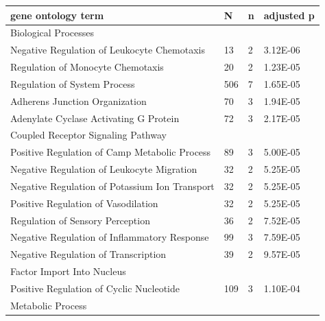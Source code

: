 \begin{refsection}
\begin{table}[H]
\small
{}\selectfont
{} \label{table3S12}
\centering
\begin{tabular}{@{}llll@{}}
\hline
gene ontology term                                  & N   & n & adjusted p \\ \hline
Biological Processes                                &     &   &                  \\
Negative Regulation of Leukocyte Chemotaxis         & 13  & 2 & 3.12E-06         \\
Regulation of Monocyte Chemotaxis                   & 20  & 2 & 1.23E-05         \\
Regulation of System Process                        & 506 & 7 & 1.65E-05         \\
Adherens Junction Organization                      & 70  & 3 & 1.94E-05         \\
Adenylate Cyclase Activating G Protein              & 72  & 3 & 2.17E-05         \\
Coupled Receptor Signaling Pathway                  &     &   &                  \\
Positive Regulation of Camp Metabolic Process       & 89  & 3 & 5.00E-05         \\
Negative Regulation of Leukocyte Migration          & 32  & 2 & 5.25E-05         \\
Negative Regulation of Potassium Ion Transport      & 32  & 2 & 5.25E-05         \\
Positive Regulation of Vasodilation                 & 32  & 2 & 5.25E-05         \\
Regulation of Sensory Perception                    & 36  & 2 & 7.52E-05         \\
Negative Regulation of Inflammatory Response        & 99  & 3 & 7.59E-05         \\
Negative Regulation of Transcription                & 39  & 2 & 9.57E-05         \\
Factor Import Into Nucleus                          &     &   &                  \\
Positive Regulation of Cyclic Nucleotide            & 109 & 3 & 1.10E-04         \\
Metabolic Process                                   &     &   &                  \\

\end{tabular}
\end{table}
\end{refsection}
